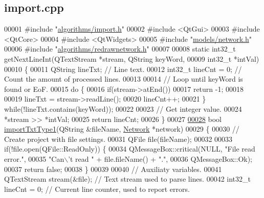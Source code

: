 \hypertarget{import_8cpp_source}{}\subsection{import.\+cpp}
\label{import_8cpp_source}

\begin{DoxyCode}
00001 \textcolor{preprocessor}{#include "\hyperlink{import_8h}{algorithms/import.h}"}
00002 \textcolor{preprocessor}{#include <QtGui>}
00003 \textcolor{preprocessor}{#include <QtCore>}
00004 \textcolor{preprocessor}{#include <QtWidgets>}
00005 \textcolor{preprocessor}{#include "\hyperlink{network_8h}{models/network.h}"}
00006 \textcolor{preprocessor}{#include "\hyperlink{redrawnetwork_8h}{algorithms/redrawnetwork.h}"}
00007 
00008 \textcolor{keyword}{static} int32\_t getNextLineInt(QTextStream *stream, QString keyWord,
00009                               int32\_t *intVal)
00010 \{
00011   QString lineTxt; \textcolor{comment}{// Line text.}
00012   int32\_t lineCnt = 0; \textcolor{comment}{// Count the amount of processed lines.}
00013 
00014   \textcolor{comment}{// Loop until keyWord is found or EoF.}
00015   \textcolor{keywordflow}{do} \{
00016     \textcolor{keywordflow}{if}(stream->atEnd())
00017       \textcolor{keywordflow}{return} -1;
00018 
00019     lineTxt = stream->readLine();
00020     lineCnt++;
00021   \} \textcolor{keywordflow}{while}(!lineTxt.contains(keyWord));
00022 
00023   \textcolor{comment}{// Get integer value.}
00024   *stream >> *intVal;
00025   \textcolor{keywordflow}{return} lineCnt;
00026 \}
00027 
\hypertarget{import_8cpp_source_l00028}{}\hyperlink{import_8h_ab30ac380d5e14f830ebc8eb839fbbdf0}{00028} \textcolor{keywordtype}{bool} \hyperlink{import_8cpp_ab30ac380d5e14f830ebc8eb839fbbdf0}{importTxtType1}(QString &fileName, \hyperlink{class_network}{Network} *network)
00029 \{
00030   \textcolor{comment}{// Create project with file settings.}
00031   QFile file(fileName);
00032 
00033   \textcolor{keywordflow}{if}(!file.open(QFile::ReadOnly)) \{
00034     QMessageBox::critical(NULL, \textcolor{stringliteral}{"File read error."},
00035                           \textcolor{stringliteral}{"Can\(\backslash\)'t read "} + file.fileName() + \textcolor{stringliteral}{"."},
00036                           QMessageBox::Ok);
00037     \textcolor{keywordflow}{return} \textcolor{keyword}{false};
00038   \}
00039 
00040   \textcolor{comment}{// Auxiliaty variables.}
00041   QTextStream stream(&file); \textcolor{comment}{// Text stream used to parse lines.}
00042   int32\_t lineCnt = 0; \textcolor{comment}{// Current line counter, used to report errors.}

\end{DoxyCode}
